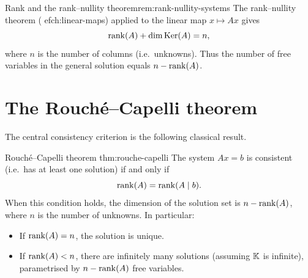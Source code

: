 \begin{remark}{Rank and the rank--nullity theorem}{rem:rank-nullity-systems}
The rank--nullity theorem (
ef{ch:linear-maps}) applied to the
linear map $x\mapsto Ax$ gives
\begin{equation}\label{eq:rank-nullity}
  \operatorname{rank}(A) + \dim\operatorname{Ker}(A) = n,
\end{equation}
where $n$ is the number of columns (i.e.\ unknowns). Thus the number
of free variables in the general solution equals $n - \operatorname{rank}(A)$.
\end{remark}


\section{The Rouch\'{e}--Capelli theorem}\label{sec:rouche-capelli}

The central consistency criterion is the following classical result.

\begin{theorem}{Rouch\'{e}--Capelli theorem}%
{thm:rouche-capelli}
The system $Ax = b$ is consistent (i.e.\ has at least one solution)
if and only if
\begin{equation}\label{eq:rouche-capelli}
  \operatorname{rank}(A) = \operatorname{rank}(A\mid b).
\end{equation}
When this condition holds, the dimension of the solution set is
$n - \operatorname{rank}(A)$, where $n$ is the number of unknowns. In particular:
\begin{itemize}
  \item If $\operatorname{rank}(A) = n$, the solution is unique.
  \item If $\operatorname{rank}(A) < n$, there are infinitely many solutions
    (assuming ${\mathbb{K}}$ is infinite), parametrised by $n - \operatorname{rank}(A)$ free
    variables.
\end{itemize}
\end{theorem}

